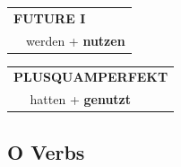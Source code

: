 \documentclass[10pt,a4paper]{revtex4-2}
\begin{document}
\begin{verbbox-acc}
\begin{tabular}{rl}
    \multicolumn{2}{l}{\textbf{FUTURE I} }\\
  &  werden + \textbf{nutzen}\\
 
  \end{tabular}
\hfill
   \begin{tabular}{rl}
      \multicolumn{2}{l}{\textbf{PLUSQUAMPERFEKT}}\\
  &  hatten + \textbf{genutzt}\\
  \end{tabular}
  
  \vspace{-5pt}


\end{verbbox-acc}

\subsection{O Verbs}
\end{document}

